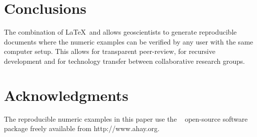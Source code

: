 

\section{Conclusions}
The combination of \LaTeX\ and \mg allows geoscientists to generate
reproducible documents where the numeric examples can be verified by
any user with the same computer setup. This allows for transparent
peer-review, for recursive development and for technology transfer
between collaborative research groups.

\section{Acknowledgments}
The reproducible numeric examples in this paper use the \mg~
open-source software package freely available from
http://www.ahay.org.



